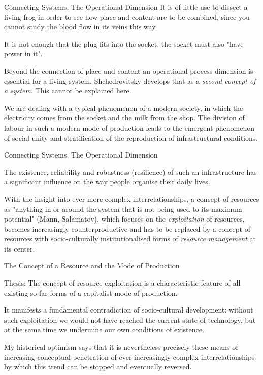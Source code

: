 \documentclass{beamer}
\begin{document}
\begin{frame}{Connecting Systems. The Operational Dimension}
It is of little use to dissect a living frog in order to see how place and
content are to be combined, since you cannot study the blood flow in its veins
this way.

It is not enough that the plug fits into the socket, the socket must also
"have power in it". 

Beyond the connection of place and content an operational process dimension is
essential for a living system.  Shchedrovitsky develops that as a \emph{second
  concept of a system}.  This cannot be explained here.

We are dealing with a typical phenomenon of a modern society, in which the
electricity comes from the socket and the milk from the shop.  The division of
labour in such a modern mode of production leads to the emergent phenomenon of
social unity and stratification of the reproduction of infrastructural
conditions.

\end{frame}

\begin{frame}{Connecting Systems. The Operational Dimension}

The existence, reliability and robustness (resilience) of such an
infrastructure has a significant influence on the way people organise their
daily lives.

With the insight into ever more complex interrelationships, a concept of
resources as "anything in or around the system that is not being used to its
maximum potential" (Mann, Salamatov), which focuses on the \emph{exploitation}
of resources, becomes increasingly counterproductive and has to be replaced by
a concept of resources with socio-culturally institutionalised forms of
\emph{resource management} at its center.

\end{frame}

\begin{frame}{The Concept of a Resource and the Mode of Production}

\begin{block}{Thesis:}
  The concept of resource exploitation is a characteristic feature of all
  existing so far forms of a capitalist mode of production.
\end{block}

It manifests a fundamental contradiction of socio-cultural development:
without such exploitation we would not have reached the current state of
technology, but at the same time we undermine our own conditions of existence.

My historical optimism says that it is nevertheless precisely these means of
increasing conceptual penetration of ever increasingly complex
interrelationships by which this trend can be stopped and eventually reversed.

\end{frame}
\end{document}
